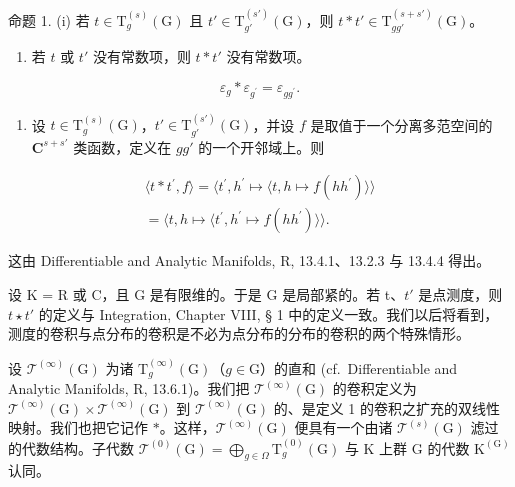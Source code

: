 命题 1. (i) 若 \(t \in \mathrm{T}_g^{(s)}(\mathrm{G})\) 且 \(t' \in \mathrm{T}_{g'}^{(s')}(\mathrm{G})\)，则 \(t * t' \in \mathrm{T}_{gg'}^{(s + s')}(\mathrm{G})\)。

\begin{enumerate}
\def\labelenumi{(\roman{enumi})}
\setcounter{enumi}{1}
\tightlist
\item
  若 \(t\) 或 \(t'\) 没有常数项，则 \(t * t'\) 没有常数项。
\end{enumerate}

\[
\varepsilon_ {g} * \varepsilon_ {g ^ {\prime}} = \varepsilon_ {g g ^ {\prime}}.
\]

\begin{enumerate}
\def\labelenumi{(\roman{enumi})}
\setcounter{enumi}{3}
\tightlist
\item
  设 \(t \in \mathrm{T}_g^{(s)}(\mathrm{G})\)，\(t' \in \mathrm{T}_{g'}^{(s')}(\mathrm{G})\)，并设 \(f\) 是取值于一个分离多范空间的 \(\mathbf{C}^{s + s'}\) 类函数，定义在 \(gg'\) 的一个开邻域上。则
\end{enumerate}

\[
\begin{array}{c} \langle t * t ^ {\prime}, f \rangle = \langle t ^ {\prime}, h ^ {\prime} \mapsto \langle t, h \mapsto f (h h ^ {\prime}) \rangle \rangle \\ = \langle t, h \mapsto \langle t ^ {\prime}, h ^ {\prime} \mapsto f (h h ^ {\prime}) \rangle \rangle . \end{array}
\]

这由 Differentiable and Analytic Manifolds, R, 13.4.1、13.2.3 与 13.4.4 得出。

设 K = R 或 C，且 G 是有限维的。于是 G 是局部紧的。若 t、\(t'\) 是点测度，则 \(t \star t'\) 的定义与 Integration, Chapter VIII, § 1 中的定义一致。我们以后将看到，测度的卷积与点分布的卷积是不必为点分布的分布的卷积的两个特殊情形。

设 \(\mathcal{T}^{(\infty)}(\mathrm{G})\) 为诸 \(\mathrm{T}_g^{(\infty)}(\mathrm{G})\)（\(g\in \mathrm{G}\)）的直和 (cf.~Differentiable and Analytic Manifolds, R, 13.6.1)。我们把 \(\mathcal{T}^{(\infty)}(\mathrm{G})\) 的卷积定义为 \(\mathcal{T}^{(\infty)}(\mathrm{G})\times \mathcal{T}^{(\infty)}(\mathrm{G})\) 到 \(\mathcal{T}^{(\infty)}(\mathrm{G})\) 的、是定义 1 的卷积之扩充的双线性映射。我们也把它记作 \(*\)。这样，\(\mathcal{T}^{(\infty)}(\mathrm{G})\) 便具有一个由诸 \(\mathcal{T}^{(s)}(\mathrm{G})\) 滤过的代数结构。子代数 \(\mathcal{T}^{(0)}(\mathrm{G}) = \bigoplus_{g\in \Omega}\mathrm{T}_g^{(0)}(\mathrm{G})\) 与 K 上群 G 的代数 \(\mathrm{K}^{\mathrm{(G)}}\) 认同。

